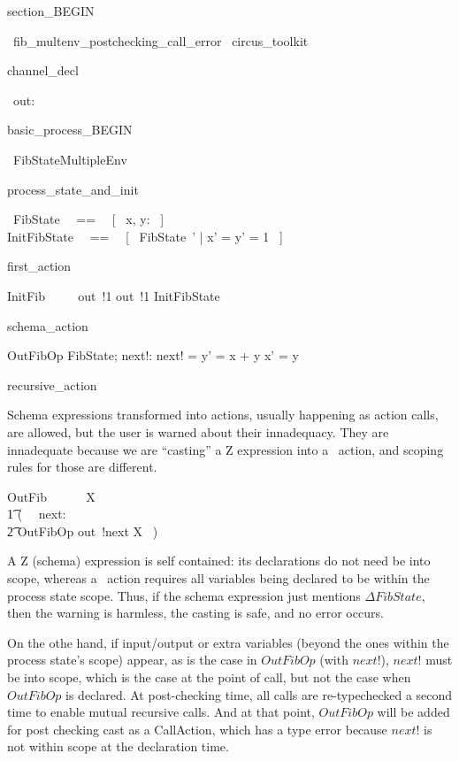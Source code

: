 section_BEGIN
\begin{zsection}
  \SECTION\ fib\_multenv\_postchecking\_call\_error \parents\ circus\_toolkit
\end{zsection}
channel_decl
\begin{circus}
    \circchannel\ out: \nat
\end{circus}
basic_process_BEGIN
\begin{circus}
    \circprocess\ FibStateMultipleEnv ~~\circdef~~ \circbegin
\end{circus}
process_state_and_init
\begin{circusaction}
    \circstate\ FibState ~~==~~ [~ x, y: \nat ~]  \land [ z: \nat ]\\
    InitFibState ~~==~~ [~ FibState~' | x' = y' = 1 ~]
\end{circusaction}
first_action
\begin{circusaction}
    InitFib ~~\circdef~~ out~!1 \then out~!1 \then InitFibState
\end{circusaction}
schema_action
\begin{schema}{OutFibOp}
    \Delta FibState; next!: \nat
\where
    next! = y' = x + y \land x' = y
\end{schema}
recursive_action

Schema expressions transformed into actions, usually happening as action calls,
are allowed, but the user is warned about their innadequacy. They are innadequate
because we are ``casting'' a Z expression into a \Circus\ action, and scoping rules 
for those are different.  
%
\begin{circusaction}
    OutFib ~~\circdef~~ \circmu\ X \circspot \\
    	\t1 (~ \circvar\ next: \nat \circspot \\
	   \t2 OutFibOp \circseq out~!next \then X ~)
\end{circusaction}
%
A Z (schema) expression is self contained: its declarations 
do not need be into scope, whereas a \Circus\ action requires all variables being 
declared to be within the process state scope. Thus, if the schema expression just
mentions $\Delta FibState$, then the warning is harmless, the casting is safe, and 
no error occurs. 

On the othe hand, if input/output or extra variables (beyond the ones within the 
process state's scope) appear, as is the case in $OutFibOp$ (with $next!$),
$next!$ must be into scope, which is the case at the point of call, but not the case 
when $OutFibOp$ is declared. At post-checking time, all calls are re-typechecked a 
second time to enable mutual recursive calls. And at that point, $OutFibOp$ will be
added for post checking cast as a CallAction, which has a type error because $next!$
is not within scope at the declaration time. 

